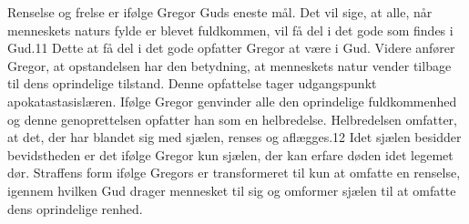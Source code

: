 Renselse og frelse er ifølge Gregor Guds eneste mål. Det vil sige, at alle, når menneskets naturs fylde er blevet fuldkommen, vil få del i det gode som findes i Gud.11 Dette at få del i det gode opfatter Gregor at være i Gud. Videre anfører Gregor, at opstandelsen har den betydning, at menneskets natur vender tilbage til dens oprindelige tilstand. Denne opfattelse tager udgangspunkt apokatastasislæren. Ifølge Gregor genvinder alle den oprindelige fuldkommenhed og denne genoprettelsen opfatter han som en helbredelse. Helbredelsen omfatter, at det, der har blandet sig med sjælen, renses og aflægges.12 Idet sjælen besidder bevidstheden er det ifølge Gregor kun sjælen, der kan erfare døden idet legemet dør. Straffens form ifølge Gregors er transformeret til kun at omfatte en renselse, igennem hvilken Gud drager mennesket til sig og omformer sjælen til at omfatte dens oprindelige renhed.